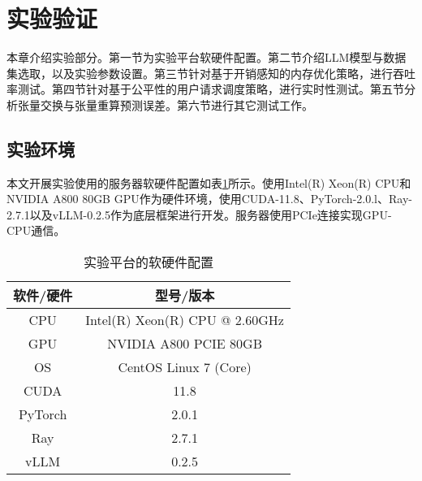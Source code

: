 \section{实验验证}

本章介绍实验部分。第一节为实验平台软硬件配置。第二节介绍LLM模型与数据集选取，以及实验参数设置。第三节针对基于开销感知的内存优化策略，进行吞吐率测试。第四节针对基于公平性的用户请求调度策略，进行实时性测试。第五节分析张量交换与张量重算预测误差。第六节进行其它测试工作。

\subsection{实验环境}

本文开展实验使用的服务器软硬件配置如表\ref{Table:实验平台的软硬件配置}所示。使用Intel(R) Xeon(R) CPU和NVIDIA A800 80GB GPU作为硬件环境，使用CUDA-11.8、PyTorch-2.0.l、Ray-2.7.1以及vLLM-0.2.5作为底层框架进行开发。服务器使用PCIe连接实现GPU-CPU通信。

\begin{table}[H]
  \centering
  \caption{实验平台的软硬件配置}
  \label{Table:实验平台的软硬件配置}
  \renewcommand{\arraystretch}{1.25}
  \small
  \begin{tabular}{c c}
    \toprule
    \textbf{软件/硬件} & \textbf{型号/版本} \\ 
    \midrule
    CPU & Intel(R) Xeon(R) CPU @ 2.60GHz  \\ 
    GPU & NVIDIA A800 PCIE 80GB \\ 
    OS & CentOS Linux 7 (Core) \\ 
    CUDA & 11.8 \\ 
    PyTorch & 2.0.1 \\ 
    Ray & 2.7.1 \\
    vLLM & 0.2.5 \\ 
    \bottomrule
  \end{tabular}
\end{table}


